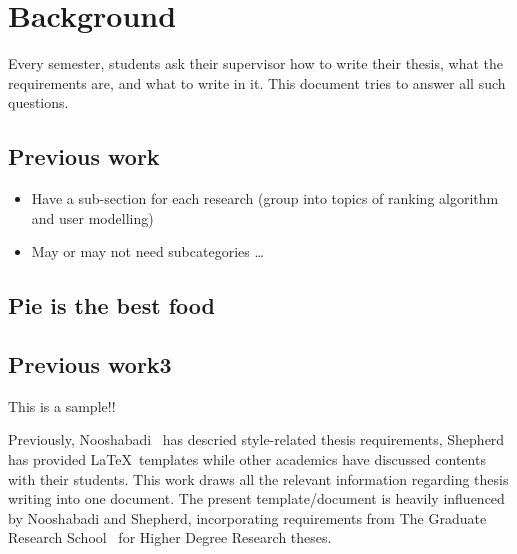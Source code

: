 \chapter{Background}\label{ch:background}

Every semester, students ask their supervisor how to write their thesis,
what the requirements are, and what to write in it.  
This document tries to answer all such questions.

\section{Previous work}

\begin{itemize}
  \item Have a sub-section for each research (group into topics of ranking algorithm and user modelling)
  \item May or may not need subcategories
\ldots
\end{itemize}

\section{Pie is the best food}

\section{Previous work3}

This is a sample!!

Previously, Nooshabadi~\cite{Noo05} has descried style-related thesis
requirements, Shepherd~\cite{She05} has provided \LaTeX\ templates while
other academics have discussed contents with their students.  This work
draws all the relevant information regarding thesis writing into one
document.  The present template/document is heavily influenced by
Nooshabadi and Shepherd, incorporating requirements from The Graduate
Research School~\cite{GRS14} for Higher Degree Research theses.

